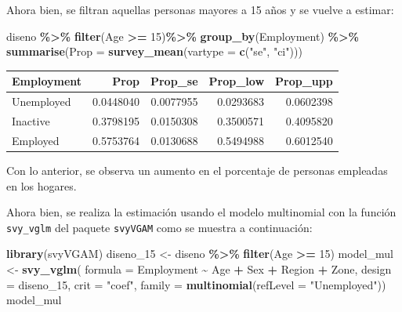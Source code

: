 \documentclass[
  12pt,
]{book}
\newenvironment{Shaded}{\begin{snugshade}}{\end{snugshade}}
\newcommand{\AttributeTok}[1]{\textcolor[rgb]{0.13,0.29,0.53}{#1}}
\newcommand{\DecValTok}[1]{\textcolor[rgb]{0.00,0.00,0.81}{#1}}
\newcommand{\FunctionTok}[1]{\textcolor[rgb]{0.13,0.29,0.53}{\textbf{#1}}}
\newcommand{\NormalTok}[1]{#1}
\newcommand{\OtherTok}[1]{\textcolor[rgb]{0.56,0.35,0.01}{#1}}
\newcommand{\SpecialCharTok}[1]{\textcolor[rgb]{0.81,0.36,0.00}{\textbf{#1}}}
\newcommand{\StringTok}[1]{\textcolor[rgb]{0.31,0.60,0.02}{#1}}
\begin{document}
Ahora bien, se filtran aquellas personas mayores a 15 años y se vuelve a estimar:

\begin{Shaded}
\begin{Highlighting}[]
\NormalTok{diseno }\SpecialCharTok{\%\textgreater{}\%} \FunctionTok{filter}\NormalTok{(Age }\SpecialCharTok{\textgreater{}=} \DecValTok{15}\NormalTok{)}\SpecialCharTok{\%\textgreater{}\%} \FunctionTok{group\_by}\NormalTok{(Employment) }\SpecialCharTok{\%\textgreater{}\%} 
  \FunctionTok{summarise}\NormalTok{(}\AttributeTok{Prop =} \FunctionTok{survey\_mean}\NormalTok{(}\AttributeTok{vartype =} \FunctionTok{c}\NormalTok{(}\StringTok{"se"}\NormalTok{, }\StringTok{"ci"}\NormalTok{)))}
\end{Highlighting}
\end{Shaded}

\begin{tabular}{l|r|r|r|r}
\hline
Employment & Prop & Prop\_se & Prop\_low & Prop\_upp\\
\hline
Unemployed & 0.0448040 & 0.0077955 & 0.0293683 & 0.0602398\\
\hline
Inactive & 0.3798195 & 0.0150308 & 0.3500571 & 0.4095820\\
\hline
Employed & 0.5753764 & 0.0130688 & 0.5494988 & 0.6012540\\
\hline
\end{tabular}

Con lo anterior, se observa un aumento en el porcentaje de personas empleadas en los hogares.

Ahora bien, se realiza la estimación usando el modelo multinomial con la función \texttt{svy\_vglm} del paquete \texttt{svyVGAM} como se muestra a continuación:

\begin{Shaded}
\begin{Highlighting}[]
\FunctionTok{library}\NormalTok{(svyVGAM)}
\NormalTok{diseno\_15 }\OtherTok{\textless{}{-}}\NormalTok{ diseno }\SpecialCharTok{\%\textgreater{}\%} \FunctionTok{filter}\NormalTok{(Age }\SpecialCharTok{\textgreater{}=} \DecValTok{15}\NormalTok{)}
\NormalTok{model\_mul }\OtherTok{\textless{}{-}} \FunctionTok{svy\_vglm}\NormalTok{(}
    \AttributeTok{formula =}\NormalTok{ Employment }\SpecialCharTok{\textasciitilde{}}\NormalTok{ Age }\SpecialCharTok{+}\NormalTok{ Sex }\SpecialCharTok{+}\NormalTok{ Region }\SpecialCharTok{+}\NormalTok{ Zone,}
                   \AttributeTok{design =}\NormalTok{ diseno\_15, }
     \AttributeTok{crit =} \StringTok{"coef"}\NormalTok{,}
    \AttributeTok{family =} \FunctionTok{multinomial}\NormalTok{(}\AttributeTok{refLevel =} \StringTok{"Unemployed"}\NormalTok{))}
\NormalTok{model\_mul}
\end{Highlighting}
\end{Shaded}
\end{document}
